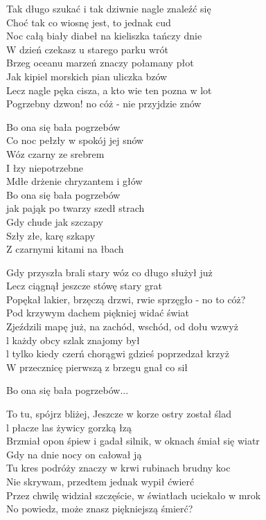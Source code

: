 \begin{text}
    Tak długo szukać i tak dziwnie nagle znaleźć się\\    
    Choć tak co wiosnę jest, to jednak cud\\
    Noc całą biały diabeł na kieliszka tańczy dnie\\
    W dzień czekasz u starego parku wrót\\ 
    Brzeg oceanu marzeń znaczy połamany płot\\
    Jak kipiel morskich pian uliczka bzów\\
    Lecz nagle pęka cisza, a kto wie ten pozna w lot\\
    Pogrzebny dzwon! no cóż - nie przyjdzie znów 

    \vin Bo ona się bała pogrzebów\\
    \vin Co noc pełzły w spokój jej snów\\
    \vin Wóz czarny ze srebrem\\
    \vin I łzy niepotrzebne\\
    \vin Mdłe drżenie chryzantem i głów\\
    \vin Bo ona się bała pogrzebów\\
    \vin jak pająk po twarzy szedł strach\\
    \vin Gdy chude jak szczapy\\
    \vin Szły złe, karę szkapy\\
    \vin Z czarnymi kitami na łbach

    Gdy przyszła brali stary wóz co długo służył już\\
    Lecz ciągnął jeszcze stówę stary grat\\
    Popękał lakier, brzęczą drzwi, rwie sprzęgło - no to cóż?\\
    Pod krzywym dachem piękniej widać świat\\
    Zjeździli mapę już, na zachód, wschód, od dołu wzwyż\\
    l każdy obcy szlak znajomy był\\
    l tylko kiedy czerń chorągwi gdzieś poprzedzał krzyż\\
    W przecznicę pierwszą z brzegu gnał co sił

    \vin Bo ona się bała pogrzebów...

    To tu, spójrz bliżej, Jeszcze w korze ostry został ślad\\
    l płacze las żywicy gorzką łzą\\
    Brzmiał opon śpiew i gadał silnik, w oknach śmiał się wiatr\\
    Gdy na dnie nocy on całował ją\\
    Tu kres podróży znaczy w krwi rubinach brudny koc\\
    Nie skrywam, przedtem jednak wypił ćwierć\\
    Przez chwilę widział szczęście, w światłach uciekało w mrok\\
    No powiedz, może znasz piękniejszą śmierć?


\end{text}
